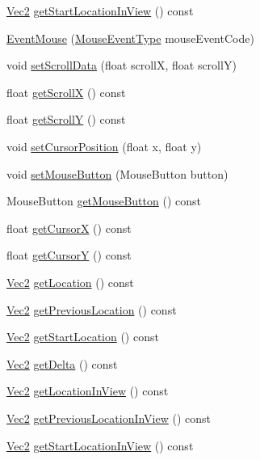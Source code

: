 \begin{DoxyCompactItemize}
\item 
\hyperlink{classVec2}{Vec2} \hyperlink{classEventMouse_a47cfa1bc5a0f367dd844d64c88ad697c}{get\+Start\+Location\+In\+View} () const
\item 
\hyperlink{classEventMouse_a0334f9666800853da6ba94df7af4ca3f}{Event\+Mouse} (\hyperlink{classEventMouse_a6a96ce5df8674cbaf01b74d2f17f213c}{Mouse\+Event\+Type} mouse\+Event\+Code)
\item 
void \hyperlink{classEventMouse_a8fb8c094794f11764abac87bb336e2a7}{set\+Scroll\+Data} (float scrollX, float scrollY)
\item 
float \hyperlink{classEventMouse_a6bca76b62d710a7eadfea9d38ef83597}{get\+ScrollX} () const
\item 
float \hyperlink{classEventMouse_ad0670c5295d1972f2b9ccb85d9d23849}{get\+ScrollY} () const
\item 
void \hyperlink{classEventMouse_ae379cb198545104ef7c79a6599213f99}{set\+Cursor\+Position} (float x, float y)
\item 
void \hyperlink{classEventMouse_a0e4f2ae870b9c3ac31df4efc66725751}{set\+Mouse\+Button} (Mouse\+Button button)
\item 
Mouse\+Button \hyperlink{classEventMouse_a5e58891e69bde3193ca51111c106a234}{get\+Mouse\+Button} () const
\item 
float \hyperlink{classEventMouse_a27e8c8d55e83a9ddbdd7bffcf7c865b5}{get\+CursorX} () const
\item 
float \hyperlink{classEventMouse_af63042e92d51480cdc990360eb4e1166}{get\+CursorY} () const
\item 
\hyperlink{classVec2}{Vec2} \hyperlink{classEventMouse_a3ee0ff253fcf6914a5fdeb9b5c18f2b2}{get\+Location} () const
\item 
\hyperlink{classVec2}{Vec2} \hyperlink{classEventMouse_a3efc2e751febf59f3068305f90cb1acc}{get\+Previous\+Location} () const
\item 
\hyperlink{classVec2}{Vec2} \hyperlink{classEventMouse_a9fdfb69f542e2f9e879db6552e8f656a}{get\+Start\+Location} () const
\item 
\hyperlink{classVec2}{Vec2} \hyperlink{classEventMouse_abda7f9a6569febd5041d4efd7fca35e6}{get\+Delta} () const
\item 
\hyperlink{classVec2}{Vec2} \hyperlink{classEventMouse_ae349cda326d1f48848a8b8f161fe66ed}{get\+Location\+In\+View} () const
\item 
\hyperlink{classVec2}{Vec2} \hyperlink{classEventMouse_af6c5fce01a5275995b993bd4f315ab60}{get\+Previous\+Location\+In\+View} () const
\item 
\hyperlink{classVec2}{Vec2} \hyperlink{classEventMouse_a47cfa1bc5a0f367dd844d64c88ad697c}{get\+Start\+Location\+In\+View} () const
\end{DoxyCompactItemize}
